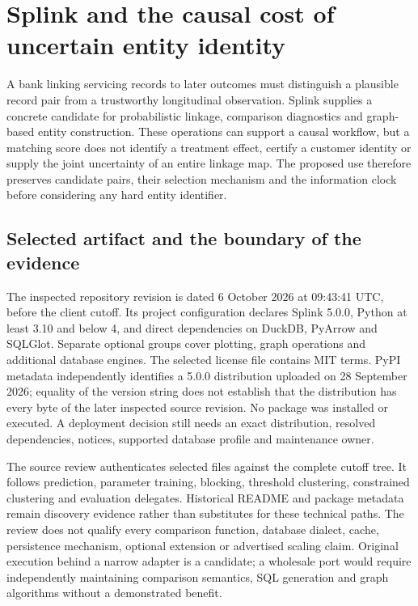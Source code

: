 \section{Splink and the causal cost of uncertain entity identity}
\label{sec:exec24-splink}
A bank linking servicing records to later outcomes must distinguish a plausible record pair from a trustworthy longitudinal observation. Splink supplies a concrete candidate for probabilistic linkage, comparison diagnostics and graph-based entity construction. These operations can support a causal workflow, but a matching score does not identify a treatment effect, certify a customer identity or supply the joint uncertainty of an entire linkage map. The proposed use therefore preserves candidate pairs, their selection mechanism and the information clock before considering any hard entity identifier.~\citep{exec24_splink_sources,exec24_splink_contract}

\subsection{Selected artifact and the boundary of the evidence}
The inspected repository revision is dated 6 October 2026 at 09:43:41 UTC, before the client cutoff. Its project configuration declares Splink 5.0.0, Python at least 3.10 and below 4, and direct dependencies on DuckDB, PyArrow and SQLGlot. Separate optional groups cover plotting, graph operations and additional database engines. The selected license file contains MIT terms. PyPI metadata independently identifies a 5.0.0 distribution uploaded on 28 September 2026; equality of the version string does not establish that the distribution has every byte of the later inspected source revision. No package was installed or executed. A deployment decision still needs an exact distribution, resolved dependencies, notices, supported database profile and maintenance owner.~\citep{exec24_splink_sources}

The source review authenticates selected files against the complete cutoff tree. It follows prediction, parameter training, blocking, threshold clustering, constrained clustering and evaluation delegates. Historical README and package metadata remain discovery evidence rather than substitutes for these technical paths. The review does not qualify every comparison function, database dialect, cache, persistence mechanism, optional extension or advertised scaling claim. Original execution behind a narrow adapter is a candidate; a wholesale port would require independently maintaining comparison semantics, SQL generation and graph algorithms without a demonstrated benefit.~\citep{exec24_splink_sources,exec24_splink_contract}

